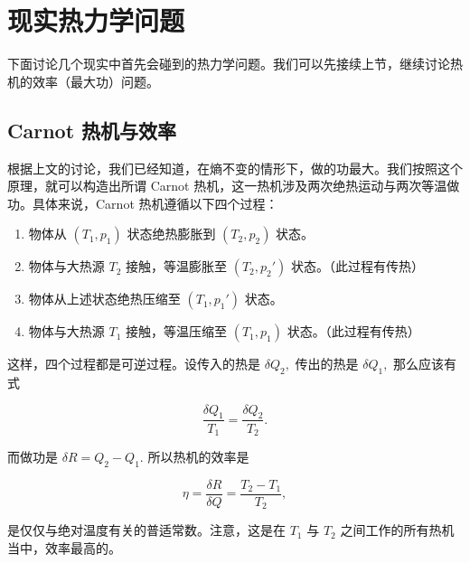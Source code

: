 \section{现实热力学问题}
下面讨论几个现实中首先会碰到的热力学问题。我们可以先接续上节，继续讨论热机的效率（最大功）问题。
\subsection{Carnot 热机与效率}
根据上文的讨论，我们已经知道，在熵不变的情形下，做的功最大。我们按照这个原理，就可以构造出所谓 Carnot 热机，这一热机涉及两次绝热运动与两次等温做功。具体来说，Carnot 热机遵循以下四个过程：
\begin{enumerate}
    \item 物体从 $(T_1,p_1)$ 状态绝热膨胀到 $(T_2,p_2)$ 状态。
    \item 物体与大热源 $T_2$ 接触，等温膨胀至 $(T_2,p_2')$ 状态。（此过程有传热）
    \item 物体从上述状态绝热压缩至 $(T_1,p_1')$ 状态。
    \item 物体与大热源 $T_1$ 接触，等温压缩至 $(T_1,p_1)$ 状态。（此过程有传热）
\end{enumerate}
这样，四个过程都是可逆过程。设传入的热是 $\delta Q_2,$ 传出的热是 $\delta Q_1,$ 那么应该有式
\begin{linenomath}\begin{equation}
\frac{\delta Q_1}{T_1} = \frac{\delta Q_2}{T_2}.
\end{equation}\end{linenomath}
而做功是 $\delta R = Q_2-Q_1.$ 所以热机的效率是 \begin{linenomath}\begin{equation}
\eta = \frac{\delta R}{\delta Q} = \frac{T_2-T_1}{T_2},
\end{equation}\end{linenomath}
是仅仅与绝对温度有关的普适常数。注意，这是在 $T_1$ 与 $T_2$ 之间工作的所有热机当中，效率最高的。

